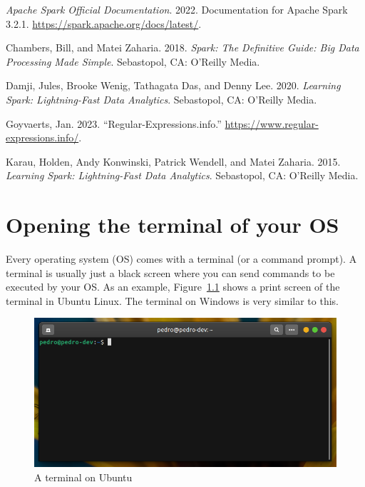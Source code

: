 \documentclass[
  11pt,
  letterpaper,
  DIV=11,
  numbers=noendperiod]{scrreprt}
\newlength{\cslhangindent}
\newlength{\cslentryspacingunit} %
\newenvironment{CSLReferences}[2] %
 {%
  \setlength{\parindent}{0pt}
  \ifodd #1
  \let\oldpar\par
  \def\par{\hangindent=\cslhangindent\oldpar}
  \fi
  \setlength{\parskip}{#2\cslentryspacingunit}
 }%
 {}
\begin{document}

\hypertarget{refs}{}
\begin{CSLReferences}{1}{0}
\leavevmode{}%
\emph{Apache Spark Official Documentation}. 2022. Documentation for
Apache Spark 3.2.1. \url{https://spark.apache.org/docs/latest/}.

\leavevmode{}%
Chambers, Bill, and Matei Zaharia. 2018. \emph{Spark: The Definitive
Guide: Big Data Processing Made Simple}. Sebastopol, CA: O'Reilly Media.

\leavevmode{}%
Damji, Jules, Brooke Wenig, Tathagata Das, and Denny Lee. 2020.
\emph{Learning Spark: Lightning-Fast Data Analytics}. Sebastopol, CA:
O'Reilly Media.

\leavevmode{}%
Goyvaerts, Jan. 2023. {``Regular-Expressions.info.''}
\url{https://www.regular-expressions.info/}.

\leavevmode{}%
Karau, Holden, Andy Konwinski, Patrick Wendell, and Matei Zaharia. 2015.
\emph{Learning Spark: Lightning-Fast Data Analytics}. Sebastopol, CA:
O'Reilly Media.

\end{CSLReferences}

\appendix
{}

\hypertarget{sec-open-terminal}{%
\chapter{Opening the terminal of your OS}\label{sec-open-terminal}}

Every operating system (OS) comes with a terminal (or a command prompt).
A terminal is usually just a black screen where you can send commands to
be executed by your OS. As an example,
Figure~\ref{fig-terminal-simple-shot} shows a print screen of the
terminal in Ubuntu Linux. The terminal on Windows is very similar to
this.

\begin{figure}

{\centering \includegraphics{Chapters/./../Figures/terminal-simple-shot.png}

}

\caption{\label{fig-terminal-simple-shot}A terminal on Ubuntu}

\end{figure}
\end{document}
